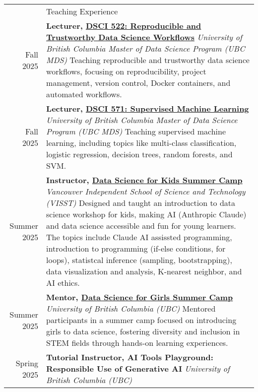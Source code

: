 \documentclass[letterpaper, 11pt]{article}
\newcommand{\headingfont}{\Large\color{OliveGreen}}
\newenvironment{SectionTable}[1]{
	\renewcommand*{\arraystretch}{1.7}
	\setlength{\tabcolsep}{10pt}
	\begin{longtable}{Rp{5.2in}} & #1 \\}
{\end{longtable}\vspace{-.3cm}}
\begin{document}
\begin{SectionTable}{\headingfont Teaching Experience}
Fall 2025 & 
\textbf{Lecturer, \href{https://ubc-mds.github.io/descriptions/}{DSCI 522: Reproducible and Trustworthy Data Science Workflows}} \newline 
\textit{University of British Columbia Master of Data Science Program (UBC MDS)}\newline
Teaching reproducible and trustworthy data science workflows, focusing on reproducibility, project management, version control, Docker containers, and automated workflows. \\
Fall 2025 & 
\textbf{Lecturer, \href{https://ubc-mds.github.io/descriptions/}{DSCI 571: Supervised Machine Learning}} \newline 
\textit{University of British Columbia Master of Data Science Program (UBC MDS)}\newline
Teaching supervised machine learning, including topics like multi-class classification, logistic regression, decision trees, random forests, and SVM. \\
Summer 2025 & 
\textbf{Instructor, \href{http://www.skysheng.io/data_science_for_kids/}{Data Science for Kids Summer Camp}} \newline 
\textit{Vancouver Independent School of Science and Technology (VISST)}\newline
Designed and taught an introduction to data science workshop for kids, making AI (Anthropic Claude) and data science accessible and fun for young learners. The topics include Claude AI assissted programming, introduction to programming (if-else conditions, for loops), statistcal inference (sampling, bootstrapping), data visualization and analysis, K-nearest neighbor, and AI ethics.\\
Summer 2025 & 
\textbf{Mentor, \href{https://katieburak.github.io/girls-in-DS/README.html}{Data Science for Girls Summer Camp}} \newline 
\textit{University of British Columbia (UBC)}\newline
Mentored participants in a summer camp focused on introducing girls to data science, fostering diversity and inclusion in STEM fields through hands-on learning experiences. \\
Spring 2025 & 
\textbf{Tutorial Instructor, AI Tools Playground: Responsible Use of Generative AI} \newline 
\textit{University of British Columbia (UBC)}\newline

\end{SectionTable}
\end{document}
